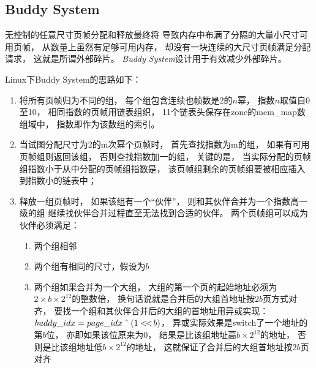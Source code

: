 \documentclass[11pt]{article}
\begin{document}
\subsection{Buddy System}
无控制的任意尺寸页帧分配和释放最终将%
导致内存中布满了分隔的大量小尺寸可用页帧，
从数量上虽然有足够可用内存，
却没有一块连续的大尺寸页帧满足分配请求，
这就是所谓外部碎片。
{\em Buddy System}设计用于有效减少外部碎片。

Linux下Buddy System的思路如下：
\begin{enumerate}
  \item 将所有页帧归为不同的组，
    每个组包含连续也帧数是2的$n$幂，
    指数$n$取值自0至10，
    相同指数的页帧用链表组织，
    11个链表头保存在zone的mem\_map数组域中，
    指数即作为该数组的索引。
  \item 当试图分配尺寸为2的m次幂个页帧时，
    首先查找指数为m的组，
    如果有可用页帧组则返回该组，
    否则查找指数加一的组，
    关键的是，
    当实际分配的页帧组指数小于从中分配的页帧组指数是，
    该页帧组剩余的页帧组要被相应插入到指数小的链表中；
  \item 释放一组页帧时，
    如果该组有一个“伙伴”，
    则和其伙伴合并为一个指数高一级的组
    继续找伙伴合并过程直至无法找到合适的伙伴。
    两个页帧组可以成为伙伴必须满足：
    \begin{enumerate}
      \item 两个组相邻
      \item 两个组有相同的尺寸，假设为$b$
      \item 两个组如果合并为一个大组，
        大组的第一个页的起始地址必须为$2 \times b \times 2^{12}$的整数倍，
        换句话说就是合并后的大组首地址按$2b$页方式对齐，
        要找一个组和其伙伴合并后的大组的首地址用异或实现：
        $buddy\_idx = page\_idx \XOR (1 <\!<\! b)$，
        异或实际效果是switch了一个地址的第$b$位，
        亦即如果该位原来为0，
        结果是比该组地址高$b \times 2^{12}$的地址，
        否则是比该组地址低$b \times 2^{12}$的地址，
        这就保证了合并后的大组首地址按$2b$页对齐
    \end{enumerate}

\end{enumerate}
\end{document}
